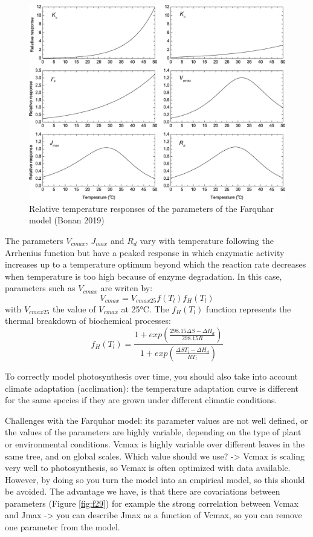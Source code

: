 \documentclass[
  12pt,
  oneside]{book}
\begin{document}
\begin{figure}

{\centering \includegraphics[width=0.8\linewidth]{figures/chap2/temp_responses} 

}

\caption{Relative temperature responses of the parameters of the Farquhar model (Bonan 2019)}\label{fig:f28bis}
\end{figure}

The parameters \(V_{cmax}\), \(J_{max}\) and \(R_d\) vary with temperature following the Arrhenius function but have a peaked response in which enzymatic activity increases up to a temperature optimum beyond which the reaction rate decreases when temperature is too high because of enzyme degradation. In this case, parameters such as \(V_{cmax}\) are writen by:
\[
V_{cmax}=V_{cmax25}f(T_l)f_H(T_l)
\]
with \(V_{cmax25}\) the value of \(V_{cmax}\) at 25°C. The \(f_H(T_l)\) function represents the thermal breakdown of biochemical processes:
\[
f_H(T_l)=\frac{1+exp\left(\frac{298.15\Delta S-\Delta H_d}{298.15R}\right)}{1+exp\left(\frac{\Delta ST_l-\Delta H_d}{RT_l}\right)}
\]

To correctly model photosynthesis over time, you should also take into account climate adaptation (acclimation): the temperature adaptation curve is different for the same species if they are grown under different climatic conditions.

Challenges with the Farquhar model: its parameter values are not well defined, or the values of the parameters are highly variable, depending on the type of plant or environmental conditions. Vcmax is highly variable over different leaves in the same tree, and on global scales.
Which value should we use? -\textgreater{} Vcmax is scaling very well to photosynthesis, so Vcmax is often optimized with data available. However, by doing so you turn the model into an empirical model, so this should be avoided.
The advantage we have, is that there are covariations between parameters (Figure \ref{fig:f29}) for example the strong correlation between Vcmax and Jmax -\textgreater{} you can describe Jmax as a function of Vcmax, so you can remove one parameter from the model.
\end{document}
